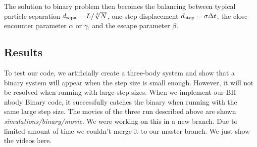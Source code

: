 The solution to binary problem then becomes the balancing between typical particle 
separation $ d_{\rm sepa} = L/\sqrt[3]{N} $, one-step displacement $ d_{\rm 
step} = \sigma \Delta t $, the close-encounter parameter $ \alpha $ or $ \gamma $, and 
the escape parameter $ \beta $.

\subsection*{Results}
To test our code, we artificially create a three-body system and show that a binary system 
will appear when the step size is small enough. However, it will not be resolved when 
running with large step sizes. When we implement our BH-nbody Binary code, it 
successfully catches the binary when running with the same large step size. The movies 
of the three run described above are shown \textit{simulations/binary/movie}. We were 
working on this in a new branch. Due to limited amount of time we couldn't merge it to our 
master branch. We just show the videos here.





